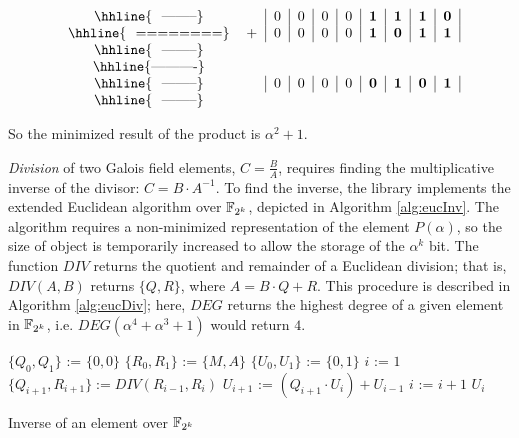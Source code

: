 \begin{Example}
\begin{equation}
\begin{tabular}{cc|c|c|c|c|c|c|c|c|} 
\hhline{~~--------}
&&$0$ & $0$ & $0$ & $0$ & $\mathbf{1}$ & $\mathbf{1}$ & $\mathbf{1}$ & $\mathbf{0}$ \\
\hhline{~~========}
&$+$&$0$ & $0$ & $0$ & $0$ & $\mathbf{1}$ & $\mathbf{0}$ & $\mathbf{1}$ & $\mathbf{1}$ \\
\hhline{~~--------}\\
\hhline{----------}\\
\hhline{~~--------}
&&$0$ & $0$ & $0$ & $0$ & $\mathbf{0}$ & $\mathbf{1}$ & $\mathbf{0}$ & $\mathbf{1}$ \\
\hhline{~~--------}
\end{tabular}
\end{equation}

So the minimized result of the product is $\alpha^2+1$.

\end{Example}

{\it Division} of two Galois field elements, $C=\frac{B}{A}$, requires finding 
the multiplicative inverse of the divisor: $C=B\cdot A^{-1}$. To find the inverse, 
the library implements the extended Euclidean algorithm over ${\mathbb{F}}_{2^k}$, depicted in
Algorithm \ref{alg:eucInv}. The algorithm requires a non-minimized 
representation of the element $P(\alpha)$, so the size of object is temporarily 
increased to allow the storage of the $\alpha^k$ bit.
The function $DIV$ returns the quotient and 
remainder of a Euclidean division; that is, $DIV(A,B)$ returns 
$\{Q,R\}$, where $A=B\cdot Q + R$. This procedure is described in Algorithm \ref{alg:eucDiv};
here, $DEG$ returns the highest degree of a given element in ${\mathbb{F}}_{2^k}$, 
i.e. $DEG(\alpha^4+\alpha^3+1)$ would return $4$.

\begin{algorithm}[hbt]
\SetAlgoNoLine

        $\{Q_0,Q_1\}$ := $\{0,0\}$\;
        $\{R_0,R_1\}$ := $\{M,A\}$\;
        $\{U_0,U_1\}$ := $\{0,1\}$\;
        $i$ := $1$\;
        {
                $\{Q_{i+1},R_{i+1}\} := DIV(R_{i-1},R_i)$\;
                $U_{i+1}$ := $(Q_{i+1} \cdot U_i) + U_{i-1}$\;
                $i$ := $i+1$\;
        }
        \Return $U_i$\;
\caption{Inverse of an element over ${\mathbb{F}}_{2^k}$}\label{alg:eucInv}
\end{algorithm}

